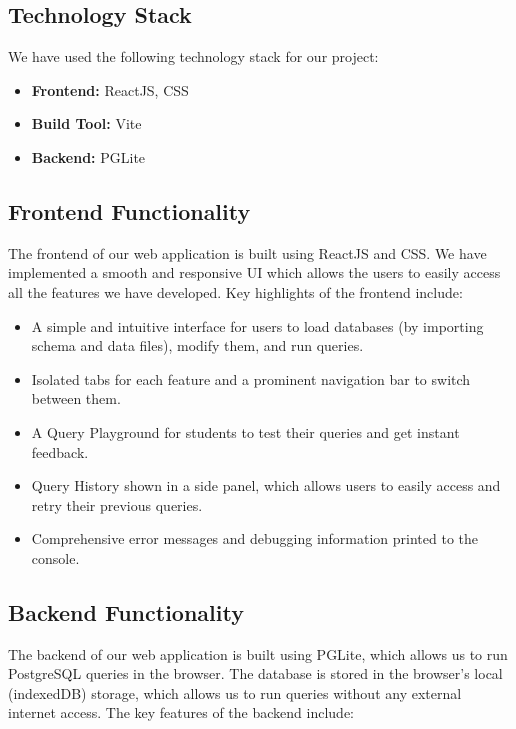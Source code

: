 \documentclass[11pt]{article}
\begin{document}
\subsection{Technology Stack}

We have used the following technology stack for our project:
\begin{itemize}
    \item \textbf{Frontend:} ReactJS, CSS
    \item \textbf{Build Tool:} Vite
    \item \textbf{Backend:} PGLite
\end{itemize}

\subsection{Frontend Functionality}

The frontend of our web application is built using ReactJS and CSS. We have implemented a smooth and responsive UI which allows the users to easily access all the features we have developed. Key highlights of the frontend include:

\begin{itemize}
    \item A simple and intuitive interface for users to load databases (by importing schema and data files), modify them, and run queries.
    \item Isolated tabs for each feature and a prominent navigation bar to switch between them.
    \item A Query Playground for students to test their queries and get instant feedback.
    \item Query History shown in a side panel, which allows users to easily access and retry their previous queries. 
    \item Comprehensive error messages and debugging information printed to the console.
\end{itemize}

\subsection{Backend Functionality}

The backend of our web application is built using PGLite, which allows us to run PostgreSQL queries in the browser. The database is stored in the browser's local (indexedDB) storage, which allows us to run queries without any external internet access. The key features of the backend include:
\end{document}
